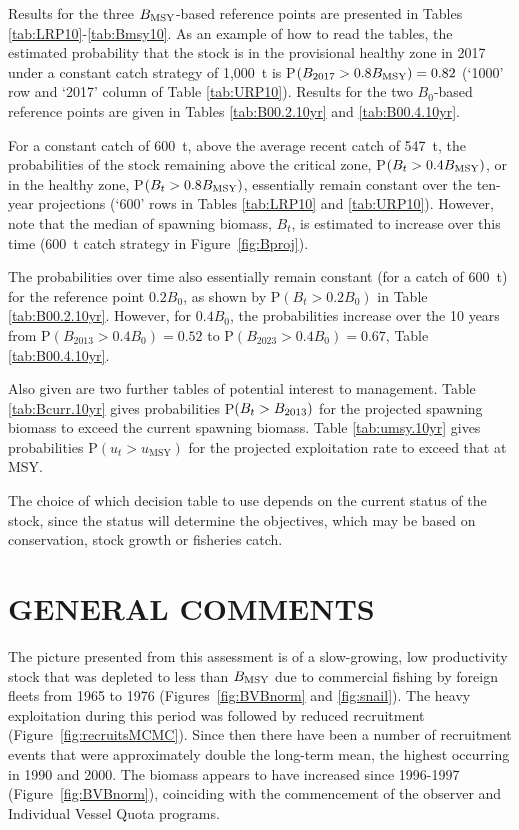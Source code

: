 Results for the three $B_\mathrm{MSY}$-based reference points are presented in Tables \ref{tab:LRP10}-\ref{tab:Bmsy10}. As an example of how to read the tables, the estimated probability that the stock is in the provisional healthy zone in 2017 under a constant catch strategy of 1,000~t is P$(B_{2017} > 0.8 B_\mathrm{MSY})=0.82$ (`1000' row and `2017' column of Table \ref{tab:URP10}). Results for the two $B_0$-based reference points are given in Tables \ref{tab:B00.2.10yr} and \ref{tab:B00.4.10yr}. 

For a constant catch of 600~t, above the average recent catch of 547~t, the probabilities of the stock remaining above the critical zone, P$(B_{t} > 0.4 B_\mathrm{MSY})$, or in the healthy zone, P$(B_{t} > 0.8 B_\mathrm{MSY})$, essentially remain constant over the ten-year projections (`600' rows in Tables \ref{tab:LRP10} and \ref{tab:URP10}). However, note that the median of spawning biomass, $B_t$, is estimated to increase over this time (600~t catch strategy in Figure~\ref{fig:Bproj}).

The probabilities over time also essentially remain constant (for a catch of 600~t) for the reference point $0.2 B_0$, as shown by P$(B_{t} > 0.2 B_0)$ in Table \ref{tab:B00.2.10yr}. However, for $0.4 B_0$, the probabilities increase over the 10 years from P$(B_{2013} > 0.4 B_0)=0.52$ to P$(B_{2023} > 0.4 B_0)=0.67$, Table \ref{tab:B00.4.10yr}. 

Also given are two further tables of potential interest to management. Table \ref{tab:Bcurr.10yr} gives probabilities P$(B_t > B_{2013})$ for the projected spawning biomass to exceed the current spawning biomass. Table \ref{tab:umsy.10yr} gives probabilities P$(u_t > u_\mathrm{MSY})$ for the projected exploitation rate to exceed that at MSY.

The choice of which decision table to use depends on the current status of the stock, since the status will determine the objectives, which may be based on conservation, stock growth or fisheries catch. 

\vspace{10mm}     %
\section{GENERAL COMMENTS}

The picture presented from this assessment is of a slow-growing, low productivity stock that was depleted to less than $B_\mathrm{MSY}$ due to commercial fishing by foreign fleets from 1965 to 1976 (Figures~\ref{fig:BVBnorm} and \ref{fig:snail}). The heavy exploitation during this period was followed by reduced recruitment (Figure~\ref{fig:recruitsMCMC}). Since then there have been a number of recruitment events that were approximately double the long-term mean, the highest occurring in 1990 and 2000. The biomass appears to have increased since 1996-1997 (Figure~\ref{fig:BVBnorm}), coinciding with the commencement of the observer and Individual Vessel Quota programs.

